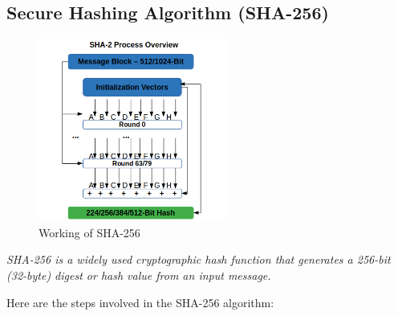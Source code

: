 \documentclass[openany]{book}
\begin{document}
\subsection{Secure Hashing Algorithm (SHA-256)}

\begin{figure}[H]
    \centering
    \includegraphics[width=0.55\textwidth]{how-the-sha2-hashing-algorithm-works.png}
    \caption{Working of SHA-256}
\end{figure}

\textit{SHA-256 is a widely used cryptographic hash function that generates a 256-bit (32-byte) digest or hash value from an input message.}

Here are the steps involved in the SHA-256 algorithm:
\end{document}

